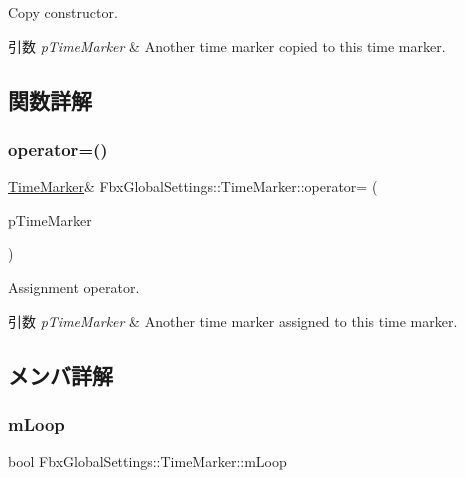Copy constructor. 
\begin{DoxyParams}{引数}
{\em p\+Time\+Marker} & Another time marker copied to this time marker. \\
\hline
\end{DoxyParams}


\subsection{関数詳解}
\mbox{\label{struct_fbx_global_settings_1_1_time_marker_a9c13f5762aece4d2aa93d4cc5c3f7b7a}} 
\subsubsection{\texorpdfstring{operator=()}{operator=()}}
{\footnotesize\ttfamily \hyperlink{struct_fbx_global_settings_1_1_time_marker}{Time\+Marker}\& Fbx\+Global\+Settings\+::\+Time\+Marker\+::operator= (\begin{DoxyParamCaption}\item[{const \hyperlink{struct_fbx_global_settings_1_1_time_marker}{Time\+Marker} \&}]{p\+Time\+Marker }\end{DoxyParamCaption})}

Assignment operator. 
\begin{DoxyParams}{引数}
{\em p\+Time\+Marker} & Another time marker assigned to this time marker. \\
\hline
\end{DoxyParams}


\subsection{メンバ詳解}
\mbox{\label{struct_fbx_global_settings_1_1_time_marker_af9f10266f6d65a9bf7ca315107407b20}} 
\subsubsection{\texorpdfstring{m\+Loop}{mLoop}}
{\footnotesize\ttfamily bool Fbx\+Global\+Settings\+::\+Time\+Marker\+::m\+Loop}



